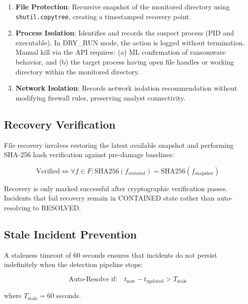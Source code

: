 \documentclass[conference]{IEEEtran}
\begin{document}
\begin{enumerate}
    \item \textbf{File Protection}: Recursive snapshot of the
    monitored directory using \texttt{shutil.copytree}, creating
    a timestamped recovery point.
    
    \item \textbf{Process Isolation}: Identifies and records
    the suspect process (PID and executable). In DRY\_RUN mode,
    the action is logged without termination. Manual kill via
    the API requires: (a) ML confirmation of ransomware behavior,
    and (b) the target process having open file handles or
    working directory within the monitored directory.
    
    \item \textbf{Network Isolation}: Records network isolation
    recommendation without modifying firewall rules, preserving
    analyst connectivity.
\end{enumerate}

\subsection{Recovery Verification}

File recovery involves restoring the latest available snapshot
and performing SHA-256 hash verification against pre-damage
baselines:

\begin{equation}
\text{Verified} \Leftrightarrow
\forall f \in F: \text{SHA256}(f_{\text{restored}}) =
\text{SHA256}(f_{\text{snapshot}})
\end{equation}

Recovery is only marked successful after cryptographic
verification passes. Incidents that fail recovery remain
in CONTAINED state rather than auto-resolving to RESOLVED.

\subsection{Stale Incident Prevention}

A staleness timeout of 60 seconds ensures that incidents
do not persist indefinitely when the detection pipeline
stops:

\begin{equation}
\text{Auto-Resolve if:} \quad
t_{\text{now}} - t_{\text{updated}} > T_{\text{stale}}
\end{equation}

where $T_{\text{stale}} = 60$ seconds.
\end{document}
